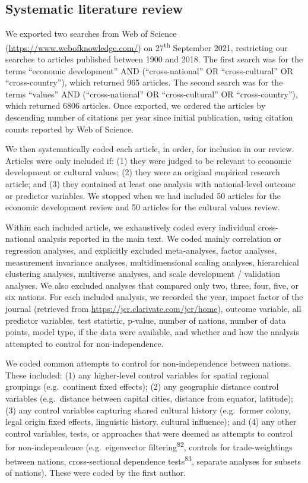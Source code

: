 \documentclass[
  man,floatsintext]{apa6}
\begin{document}
\hypertarget{systematic-literature-review}{%
\subsection{Systematic literature review}\label{systematic-literature-review}}

We exported two searches from Web of Science (\url{https://www.webofknowledge.com/}) on 27\textsuperscript{th} September 2021, restricting our searches to articles published between 1900 and 2018. The first search was for the terms ``economic development'' AND (``cross-national'' OR ``cross-cultural'' OR ``cross-country''), which returned 965 articles. The second search was for the terms ``values'' AND (``cross-national'' OR ``cross-cultural'' OR ``cross-country''), which returned 6806 articles. Once exported, we ordered the articles by descending number of citations per year since initial publication, using citation counts reported by Web of Science.

We then systematically coded each article, in order, for inclusion in our review. Articles were only included if: (1) they were judged to be relevant to economic development or cultural values; (2) they were an original empirical research article; and (3) they contained at least one analysis with national-level outcome or predictor variables. We stopped when we had included 50 articles for the economic development review and 50 articles for the cultural values review.

Within each included article, we exhaustively coded every individual cross-national analysis reported in the main text. We coded mainly correlation or regression analyses, and explicitly excluded meta-analyses, factor analyses, measurement invariance analyses, multidimensional scaling analyses, hierarchical clustering analyses, multiverse analyses, and scale development / validation analyses. We also excluded analyses that compared only two, three, four, five, or six nations. For each included analysis, we recorded the year, impact factor of the journal (retrieved from \url{https://jcr.clarivate.com/jcr/home}), outcome variable, all predictor variables, test statistic, p-value, number of nations, number of data points, model type, if the data were available, and whether and how the analysis attempted to control for non-independence.

We coded common attempts to control for non-independence between nations. These included: (1) any higher-level control variables for spatial regional groupings (e.g.~continent fixed effects); (2) any geographic distance control variables (e.g.~distance between capital cities, distance from equator, latitude); (3) any control variables capturing shared cultural history (e.g.~former colony, legal origin fixed effects, linguistic history, cultural influence); and (4) any other control variables, tests, or approaches that were deemed as attempts to control for non-independence (e.g.~eigenvector filtering\textsuperscript{82}, controls for trade-weightings between nations, cross-sectional dependence tests\textsuperscript{83}, separate analyses for subsets of nations). These were coded by the first author.
\end{document}
